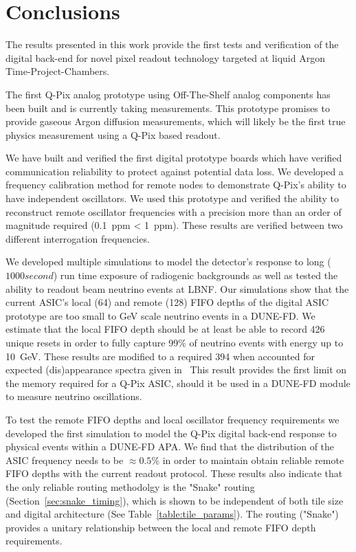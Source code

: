 \section{Conclusions}

The results presented in this work provide the first tests and verification of the digital back-end for novel pixel readout technology targeted at liquid Argon Time-Project-Chambers.

The first Q-Pix analog prototype using Off-The-Shelf analog components has been built and is currently taking measurements.
This prototype promises to provide gaseous Argon diffusion measurements, which will likely be the first true physics measurement using a Q-Pix based readout.

We have built and verified the first digital prototype boards which have verified communication reliability to protect against potential data loss.
We developed a frequency calibration method for remote nodes to demonstrate Q-Pix's ability to have independent oscillators.
We used this prototype and verified the ability to reconstruct remote oscillator frequencies with a precision more than an order of magnitude required (0.1~\unit{ppm} < 1~\unit{ppm}).
These results are verified between two different interrogation frequencies.

We developed multiple simulations to model the detector's response to long ($1000 second$) run time exposure of radiogenic backgrounds as well as tested the ability to readout beam neutrino events at LBNF.
Our simulations show that the current ASIC's local (64) and remote (128) FIFO depths of the digital ASIC prototype are too small to \unit{GeV} scale neutrino events in a DUNE-FD.
We estimate that the local FIFO depth should be at least be able to record 426 unique resets in order to fully capture 99\% of neutrino events with energy up to 10~\unit{GeV}.
These results are modified to a required 394 when accounted for expected (dis)appearance spectra given in~\citep{DUNE_FD_TDRv2_2020}
This result provides the first limit on the memory required for a Q-Pix ASIC, should it be used in a DUNE-FD module to measure neutrino oscillations.

To test the remote FIFO depths and local oscillator frequency requirements we developed the first simulation to model the Q-Pix digital back-end response to physical events within a DUNE-FD APA.
We find that the distribution of the ASIC frequency needs to be $\approx 0.5\%$ in order to maintain obtain reliable remote FIFO depths with the current readout protocol. 
These results also indicate that the only reliable routing methodolgy is the "Snake" routing (Section~\ref{sec:snake_timing}), which is shown to be independent of both tile size and digital architecture (See Table~\ref{table:tile_params}).
The routing ("Snake") provides a unitary relationship between the local and remote FIFO depth requirements.

